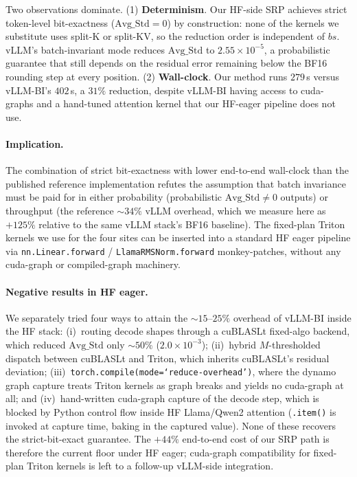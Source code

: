 \documentclass{article}
\begin{document}
Two observations dominate. (1) \textbf{Determinism}. Our HF-side SRP achieves
strict token-level bit-exactness ($\mathrm{Avg\_Std}\!=\!0$) by construction:
none of the kernels we substitute uses split-K or split-KV, so the reduction
order is independent of $\mathit{bs}$. vLLM's batch-invariant mode reduces
$\mathrm{Avg\_Std}$ to $2.55\!\times\!10^{-5}$, a probabilistic guarantee
that still depends on the residual error remaining below the BF16 rounding
step at every position. (2) \textbf{Wall-clock}. Our method runs $279$\,s
versus vLLM-BI's $402$\,s, a $31\%$ reduction, despite vLLM-BI having access
to cuda-graphs and a hand-tuned attention kernel that our HF-eager pipeline
does not use.

\paragraph{Implication.}
The combination of strict bit-exactness with lower end-to-end wall-clock
than the published reference implementation refutes the assumption that
batch invariance must be paid for in either probability (probabilistic
$\mathrm{Avg\_Std}\!\ne\!0$ outputs) or throughput (the reference
$\sim\!34\%$ vLLM overhead, which we measure here as $+125\%$ relative to
the same vLLM stack's BF16 baseline). The fixed-plan Triton kernels we use
for the four sites can be inserted into a standard HF eager pipeline via
\texttt{nn.Linear.forward} / \texttt{LlamaRMSNorm.forward} monkey-patches,
without any cuda-graph or compiled-graph machinery.

\paragraph{Negative results in HF eager.}
We separately tried four ways to attain the $\sim\!15$--$25\%$ overhead of
vLLM-BI inside the HF stack: (i)~routing decode shapes through a cuBLASLt
fixed-algo backend, which reduced $\mathrm{Avg\_Std}$ only $\sim\!50\%$
($2.0\!\times\!10^{-3}$); (ii)~hybrid $M$-thresholded dispatch between
cuBLASLt and Triton, which inherits cuBLASLt's residual deviation;
(iii)~\texttt{torch.compile(mode=`reduce-overhead')}, where the dynamo
graph capture treats Triton kernels as graph breaks and yields no
cuda-graph at all; and (iv)~hand-written cuda-graph capture of the decode
step, which is blocked by Python control flow inside HF Llama/Qwen2
attention (\texttt{.item()} is invoked at capture time, baking in the
captured value). None of these recovers the strict-bit-exact guarantee.
The $+44\%$ end-to-end cost of our SRP path is therefore the current
floor under HF eager; cuda-graph compatibility for fixed-plan Triton
kernels is left to a follow-up vLLM-side integration.
\end{document}
